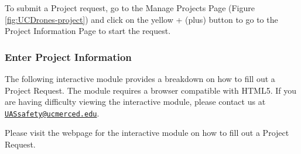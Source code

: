 \documentclass[
  12pt,
]{book}
\begin{document}
To submit a Project request, go to the Manage Projects Page (Figure \ref{fig:UCDrones-project}) and click on the yellow + (plus) button to go to the Project Information Page to start the request.

\hypertarget{enter-project-information}{%
\subsubsection{Enter Project Information}\label{enter-project-information}}

The following interactive module provides a breakdown on how to fill out a Project Request. The module requires a browser compatible with HTML5. If you are having difficulty viewing the interactive module, please contact us at \href{mailto:UASsafety@ucmerced.edu}{\nolinkurl{UASsafety@ucmerced.edu}}.

Please visit the webpage for the interactive module on how to fill out a Project Request.
\end{document}
